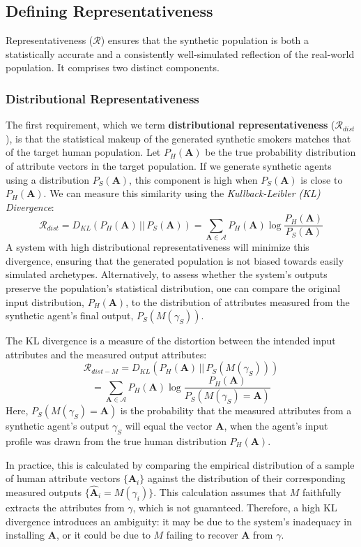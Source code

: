 \subsection{Defining Representativeness}

Representativeness ($\mathcal{R}$) ensures that the synthetic population is both a
statistically accurate and a consistently well-simulated reflection of the real-world
population. It comprises two distinct components.

\subsubsection{Distributional Representativeness}

The first requirement, which we term \textbf{distributional representativeness}
($\mathcal{R}_{dist}$), is that the statistical makeup of the generated synthetic
smokers matches that of the target human population. Let $P_H(\textbf{A})$ be the true
probability distribution of attribute vectors in the target population. If we generate
synthetic agents using a distribution $P_S(\textbf{A})$, this component is high when
$P_S(\textbf{A})$ is close to $P_H(\textbf{A})$. We can measure this similarity using
the \emph{Kullback-Leibler (KL) Divergence}:
\[\mathcal{R}_{dist} = D_{KL}(P_H(\textbf{A}) \,||\, P_S(\textbf{A})) = \sum_{\textbf{A} \in \mathcal{A}} P_H(\textbf{A}) \log\frac{P_H(\textbf{A})}{P_S(\textbf{A})}\]
A system with high distributional representativeness will minimize this divergence,
ensuring that the generated population is not biased towards easily simulated
archetypes. Alternatively, to assess whether the system's outputs preserve the
population's statistical distribution, one can compare the original input distribution,
$P_H(\textbf{A})$, to the distribution of attributes measured from the synthetic
agent's final output, $P_S(M(\gamma_S))$.

The KL divergence is a measure of the distortion between the intended input attributes
and the measured output attributes:
\[\mathcal{R}_{dist-M} = D_{KL}(P_H(\textbf{A}) \,||\, P_S(M(\gamma_S)))\]
\[= \sum_{\textbf{A} \in \mathcal{A}} P_H(\textbf{A}) \log\frac{P_H(\textbf{A})}{P_S(M(\gamma_S)=\textbf{A})}\]
Here, $P_S(M(\gamma_S)=\textbf{A})$ is the probability that the measured attributes
from a synthetic agent's output $\gamma_S$ will equal the vector $\textbf{A}$, when the
agent's input profile was drawn from the true human distribution $P_H(\textbf{A})$.

In practice, this is calculated by comparing the empirical distribution of a sample of
human attribute vectors $\{\textbf{A}_i\}$ against the distribution of their
corresponding measured outputs $\{\hat{\textbf{A}}_i = M(\gamma_i)\}$. This calculation
assumes that $M$ faithfully extracts the attributes from $\gamma$, which is not
guaranteed. Therefore, a high KL divergence introduces an ambiguity: it may be due to
the system's inadequacy in installing $\textbf{A}$, or it could be due to $M$ failing
to recover $\textbf{A}$ from $\gamma$.

